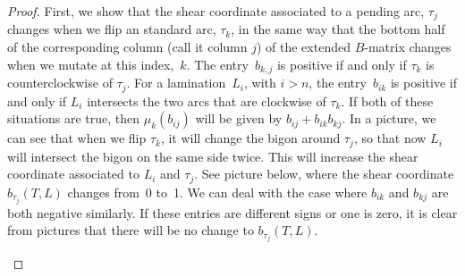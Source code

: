 \documentclass[pdftex]{sigma}%
\numberwithin{equation}{section}
\begin{document}
\begin{proof}First, we show that the shear coordinate associated to a pending arc, $\tau_j$ changes when we flip an standard arc, $\tau_k$, in the same way that the bottom half of the corresponding column (call it column $j$) of the extended
$B$-matrix changes when we mutate at this index,~$k$. The entry~$b_{k,j}$ is positive if and only if $\tau_k$ is counterclockwise of $\tau_j$. For a lamination~$L_i$, with $i > n$, the entry~$b_{ik}$ is positive if and only if $L_i$ intersects the two arcs that are clockwise of $\tau_k$. If both of these situations are true, then $\mu_k(b_{ij})$ will be given by $b_{ij} + b_{ik}b_{kj}$. In a picture, we can see that when we flip $\tau_k$, it will change the bigon around $\tau_j$, so that now $L_i$ will intersect the bigon on the same side twice. This will increase the shear coordinate associated to $L_i$ and $\tau_j$. See picture below, where the shear coordinate $b_{\tau_j}(T, L)$ changes from~0 to~1. We can deal with the case where $b_{ik}$ and $b_{kj}$ are both negative similarly. If these entries are different signs or one is zero, it is clear from pictures that there will be no change to $b_{\tau_j}(T,L)$.

\begin{center}
\end{center}
\end{proof}
\end{document}
